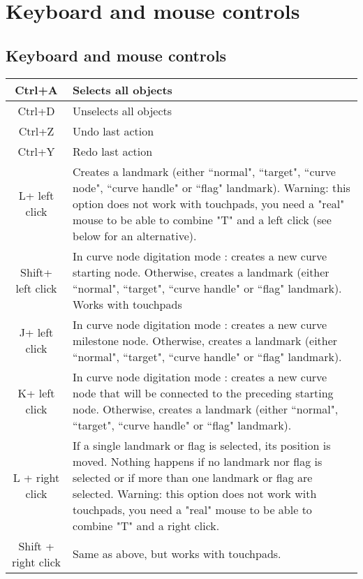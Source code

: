 \chapter{Keyboard and mouse controls}
\minitoc  

 \section{Keyboard and mouse controls}
\begin{tabularx}{\linewidth}{ | c | X | }
 \hline			
   Ctrl+A & Selects all objects \\ \hline				
   Ctrl+D & Unselects all objects \\ \hline				
	 Ctrl+Z & Undo last action \\ \hline				
	Ctrl+Y & Redo last action \\ \hline				
   L+ left click & Creates a landmark (either ``normal", ``target", ``curve node", ``curve handle" or ``flag" landmark). Warning: this option does not work with touchpads, you need a "real" mouse to be able to combine "T" and a left click (see below for an alternative).\\ \hline	

   
 Shift+ left click & In curve node digitation mode :  creates a new curve starting node. Otherwise, creates a landmark (either ``normal", ``target",  ``curve handle" or ``flag" landmark). Works with touchpads\\ \hline	   

 J+ left click & In curve node digitation mode :  creates a new curve milestone node. Otherwise, creates a landmark (either ``normal", ``target",  ``curve handle" or ``flag" landmark). \\ \hline	      		

 K+ left click & In curve node digitation mode :  creates a new curve node that will be connected to the preceding starting node. Otherwise, creates a landmark (either ``normal", ``target",  ``curve handle" or ``flag" landmark). \\ \hline	      		
		
L + right click & If a single landmark or flag is selected, its position is
moved. Nothing happens if no landmark nor flag is selected
or if more than one landmark or flag are selected. Warning: this option does not work with touchpads, you need a "real" mouse to be able to combine "T" and a right click. \\ \hline			
Shift + right click & Same as above, but works with touchpads.\\ \hline			


\end{tabularx}
